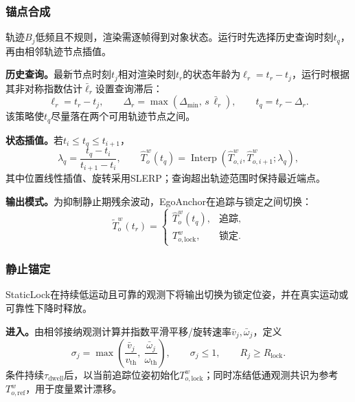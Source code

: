 \documentclass[review]{vgtc}
\begin{document}
\subsubsection{锚点合成}\label{sec:frame-output}

轨迹$B_j$低频且不规则，渲染需逐帧得到对象状态。运行时先选择历史查询时刻$t_q$，再由相邻轨迹节点插值。

\textbf{历史查询。}最新节点时刻$t_j$相对渲染时刻$t_r$的状态年龄为$\ell_r=t_r-t_j$，运行时根据其非对称指数估计$\bar{\ell}_r$设置查询滞后：
\begin{equation}
\ell_r = t_r - t_j, \qquad \Delta_r = \max(\Delta_{\min},\, s\,\bar{\ell}_r), \qquad t_q = t_r - \Delta_r.
\label{eq:target-time}
\end{equation}
该策略使$t_q$尽量落在两个可用轨迹节点之间。

\textbf{状态插值。}若$t_i\leq t_q\leq t_{i+1}$，
\begin{equation}
\lambda_q = \frac{t_q - t_i}{t_{i+1} - t_i}, \qquad \widehat{T}_o^w(t_q) = \operatorname{Interp}(\widehat{T}_{o,i}^{w}, \widehat{T}_{o,i+1}^{w}; \lambda_q),
\label{eq:history-interp}
\end{equation}
其中位置线性插值、旋转采用SLERP；查询超出轨迹范围时保持最近端点。

\textbf{输出模式。}为抑制静止期残余波动，EgoAnchor在追踪与锁定之间切换：
\begin{equation}
\widetilde{T}_o^w(t_r) = \begin{cases}
\widehat{T}_o^w(t_q), & \text{追踪}, \\
T_{o,\mathrm{lock}}^w, & \text{锁定}.
\end{cases}
\label{eq:staticlock}
\end{equation}

\subsubsection{静止锚定}\label{sec:staticlock}

StaticLock在持续低运动且可靠的观测下将输出切换为锁定位姿，并在真实运动或可靠性下降时释放。

\textbf{进入。}由相邻接纳观测计算并指数平滑平移/旋转速率$\bar v_j,\bar\omega_j$，定义
\begin{equation}
\sigma_j = \max\left(\frac{\bar{v}_j}{v_{\mathrm{th}}},\ \frac{\bar{\omega}_j}{\omega_{\mathrm{th}}}\right), \qquad \sigma_j \leq 1, \qquad R_j \geq R_{\mathrm{lock}}.
\label{eq:lock-entry}
\end{equation}
条件持续$\tau_{\mathrm{dwell}}$后，以当前追踪位姿初始化$T_{o,\mathrm{lock}}^w$；同时冻结低通观测共识为参考$T_{o,\mathrm{ref}}^w$，用于度量累计漂移。
\end{document}
